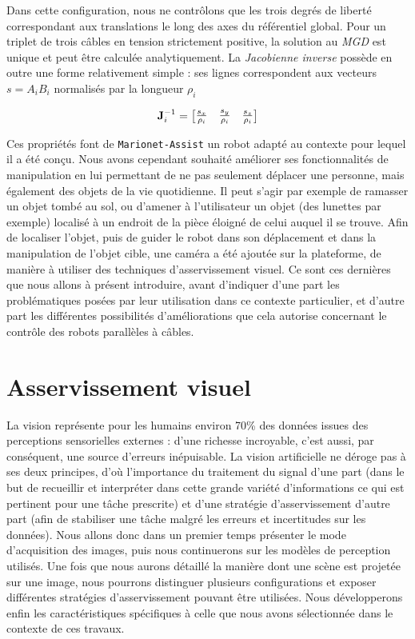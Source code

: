 Dans cette configuration, nous ne contrôlons que les trois degrés de liberté correspondant aux translations le long des axes du référentiel global. Pour un triplet de trois câbles en tension strictement positive, la solution au {\it MGD} est unique et peut être calculée analytiquement. La {\it Jacobienne inverse} possède en outre une forme relativement simple : ses lignes correspondent aux vecteurs $s = A_iB_i$ normalisés par la longueur $\rho_i$

\begin{equation}
{\bf J}^{-1}_i =
\begin{bmatrix}
 \frac {s_x} {\rho_i} & \frac {s_y} {\rho_i} & \frac {s_z} {\rho_i}
\end{bmatrix}
\label{intro:eq11}
\end{equation}

Ces propriétés font de {\tt Marionet-Assist} un robot adapté au contexte pour lequel il a été conçu. Nous avons cependant souhaité améliorer ses fonctionnalités de manipulation en lui permettant de ne pas seulement déplacer une personne, mais également des objets de la vie quotidienne. Il peut s'agir par exemple de ramasser un objet tombé au sol, ou d'amener à l'utilisateur un objet (des lunettes par exemple) localisé à un endroit de la pièce éloigné de celui auquel il se trouve. Afin de localiser l'objet, puis de guider le robot dans son déplacement et dans la manipulation de l'objet cible, une caméra a été ajoutée sur la plateforme, de manière à utiliser des techniques d'asservissement visuel. Ce sont ces dernières que nous allons à présent introduire, avant d'indiquer d'une part les problématiques posées par leur utilisation dans ce contexte particulier, et d'autre part les différentes possibilités d'améliorations que cela autorise concernant le contrôle des robots parallèles à câbles.

\section{Asservissement visuel}

La vision représente pour les humains environ 70\% des données issues des perceptions sensorielles externes \cite{purves2004neuroscience} : d'une richesse incroyable, c'est aussi, par conséquent, une source d'erreurs inépuisable. La vision artificielle ne déroge pas à ses deux principes, d'où l'importance du traitement du signal d'une part (dans le but de recueillir et interpréter dans cette grande variété d'informations ce qui est pertinent pour une tâche prescrite) et
d'une stratégie d'asservissement d'autre part (afin de stabiliser une tâche malgré les erreurs et incertitudes sur les données). Nous allons donc
dans un premier temps présenter le mode d'acquisition des images, puis nous continuerons sur les modèles de perception utilisés. Une fois que nous aurons détaillé la manière dont une scène est projetée sur une image, nous pourrons distinguer plusieurs configurations et exposer différentes stratégies d'asservissement pouvant être utilisées. Nous développerons enfin les caractéristiques spécifiques à celle que nous avons sélectionnée dans le contexte de ces travaux.
 
